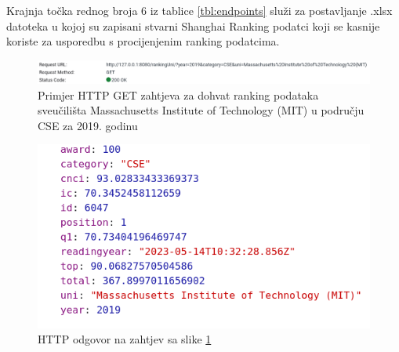 \documentclass[times, utf8, zavrsni]{fer}
\begin{document}
Krajnja točka rednog broja 6 iz tablice \ref{tbl:endpoints} služi za postavljanje .xlsx datoteka u kojoj su zapisani stvarni Shanghai Ranking podatci 
koji se kasnije koriste za usporedbu s procijenjenim ranking podatcima.\\
\begin{figure}[htb]
    \centering
       \includegraphics[scale=0.36]{get1.png} 
       \caption{Primjer HTTP GET zahtjeva za dohvat ranking podataka sveučilišta Massachusetts Institute of Technology (MIT) u području CSE za 2019. godinu}
       \label{fig:get1}
       \end{figure}
\begin{figure}[htb]
        \centering
           \includegraphics[scale=0.4]{get2.png} 
           \caption{HTTP odgovor na zahtjev sa slike \ref{fig:get1}}
           \label{fig:get2}
           \end{figure}
\end{document}
